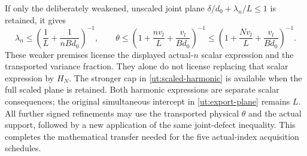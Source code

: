 If only the deliberately weakened, unscaled joint plane
$\delta/d_0+\lambda_n/L\le1$ is retained, it gives
\[
 \lambda_n\le\left(\frac1L+\frac1{nBd_0}\right)^{-1},\qquad
 \theta\le\left(1+\frac{nv_l}{L}
                         +\frac{v_l}{Bd_0}\right)^{-1}
 \le\left(1+\frac{Nv_l}{L}
                         +\frac{v_l}{Bd_0}\right)^{-1}.
\]
These weaker premises license the displayed actual-$n$
scalar expression and the transported variance fraction. They alone
do not license replacing that scalar expression by $H_N$.
The stronger cap in \eqref{ut:scaled-harmonic} is available when the
full scaled plane is retained. Both harmonic expressions are separate
scalar consequences; the original simultaneous intercept in
\eqref{ut:export-plane} remains $L$.
All further signed refinements may use the transported physical
$\theta$ and the actual support, followed by a new application of
the same joint-defect inequality. This completes the mathematical
transfer needed for the five actual-index acquisition schedules.

